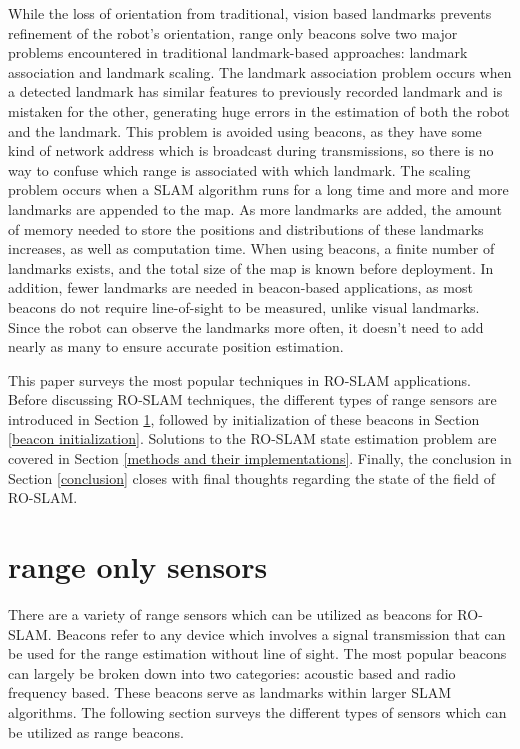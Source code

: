 \documentclass[conference]{IEEEtran}
\begin{document}
		While the loss of orientation from traditional, vision based landmarks prevents refinement of the robot's orientation, range only beacons solve two major problems encountered in traditional landmark-based approaches: landmark association and landmark scaling. The landmark association problem occurs when a detected landmark has similar features to previously recorded landmark and is mistaken for the other, generating huge errors in the estimation of both the robot and the landmark. This problem is avoided using beacons, as they have some kind of network address which is broadcast during transmissions, so there is no way to confuse which range is associated with which landmark. The scaling problem occurs when a SLAM algorithm runs for a long time and more and more landmarks are appended to the map. As more landmarks are added, the amount of memory needed to store the positions and distributions of these landmarks increases, as well as computation time. When using beacons, a finite number of landmarks exists, and the total size of the map is known before deployment. In addition, fewer landmarks are needed in beacon-based applications, as most beacons do not require line-of-sight to be measured, unlike visual landmarks. Since the robot can observe the landmarks more often, it doesn't need to add nearly as many to ensure accurate position estimation.
		
		This paper surveys the most popular techniques in RO-SLAM applications. Before discussing RO-SLAM techniques, the different types of range sensors are introduced in Section \ref{range only sensors}, followed by initialization of these beacons in Section \ref{beacon initialization}. Solutions to the RO-SLAM state estimation problem are covered in Section \ref{methods and their implementations}. Finally, the conclusion in Section \ref{conclusion} closes with final thoughts regarding the state of the field of RO-SLAM.
	
	
	\section{range only sensors}
	\label{range only sensors}
		There are a variety of range sensors which can be utilized as beacons for RO-SLAM. Beacons refer to any device which involves a signal transmission that can be used for the range estimation without line of sight. The most popular beacons can largely be broken down into two categories: acoustic based and radio frequency based. These beacons serve as landmarks within larger SLAM algorithms. The following section surveys the different types of sensors which can be utilized as range beacons.
	
\end{document}
